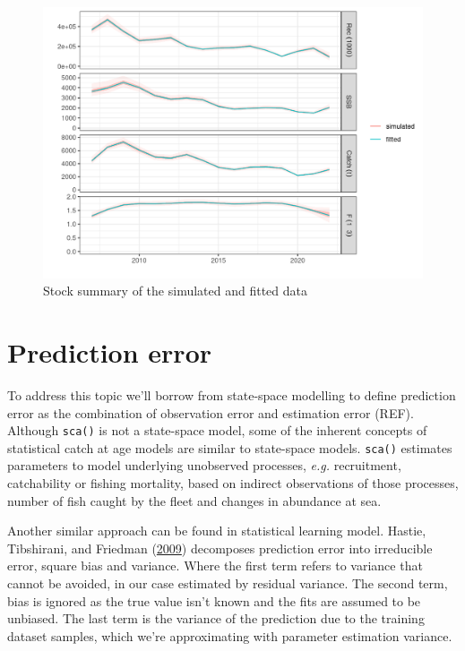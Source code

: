 \documentclass[
]{book}
\begin{document}
\begin{figure}
\centering
\includegraphics{_bookdown_files/_main_files/figure-html/sim2-1.png}
\caption{\label{fig:sim2}Stock summary of the simulated and fitted data}
\end{figure}

\hypertarget{prediction-error}{%
\section{Prediction error}\label{prediction-error}}

To address this topic we'll borrow from state-space modelling to define prediction error as the combination of observation error and estimation error (REF). Although \texttt{sca()} is not a state-space model, some of the inherent concepts of statistical catch at age models are similar to state-space models. \texttt{sca()} estimates parameters to model underlying unobserved processes, \emph{e.g.} recruitment, catchability or fishing mortality, based on indirect observations of those processes, number of fish caught by the fleet and changes in abundance at sea.

Another similar approach can be found in statistical learning model. Hastie, Tibshirani, and Friedman (\protect\hyperlink{ref-hastie2009}{2009}) decomposes prediction error into irreducible error, square bias and variance. Where the first term refers to variance that cannot be avoided, in our case estimated by residual variance. The second term, bias is ignored as the true value isn't known and the fits are assumed to be unbiased. The last term is the variance of the prediction due to the training dataset samples, which we're approximating with parameter estimation variance.
\end{document}
